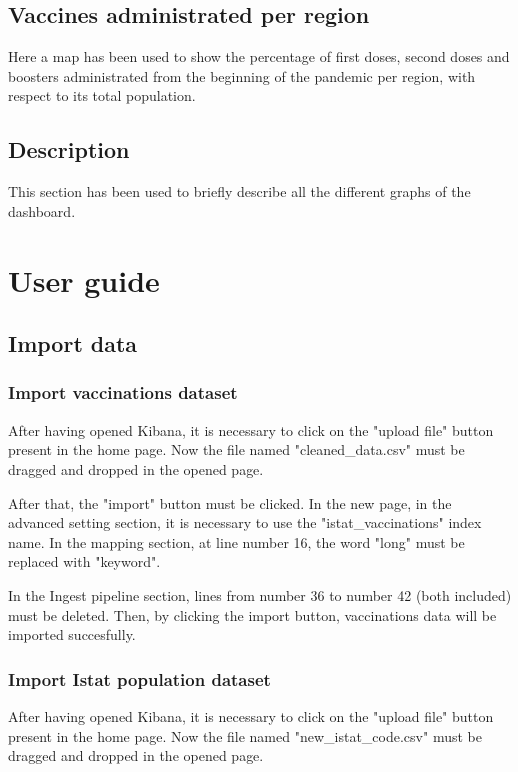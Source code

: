\documentclass{article}
\begin{document}
\subsection{Vaccines administrated per region}
Here a map has been used to show the percentage of first doses, second doses and boosters administrated from the beginning of the pandemic per region, with respect to its total population.

\subsection{Description}
This section has been used to briefly describe all the different graphs of the dashboard.

\newpage

\section{User guide}

\subsection{Import data}
\subsubsection{Import vaccinations dataset}
After having opened Kibana, it is necessary to click on the {\selectfont"upload file"} button present in the home page. Now the file named {\selectfont"cleaned\_data.csv"} must be dragged and dropped in the opened page.

After that, the {\selectfont"import"} button must be clicked. In the new page, in the advanced setting section, it is necessary to use the {\selectfont"istat\_vaccinations"} index name. In the mapping section, at line number 16, the word "long" must be replaced with "keyword".

In the Ingest pipeline section, lines from number 36 to number 42 (both included) must be deleted.
Then, by clicking the import button, vaccinations data will be imported succesfully.

\subsubsection{Import Istat population dataset}
After having opened Kibana, it is necessary to click on the {\selectfont"upload file"} button present in the home page. Now the file named {\selectfont"new\_istat\_code.csv"} must be dragged and dropped in the opened page.
\end{document}
